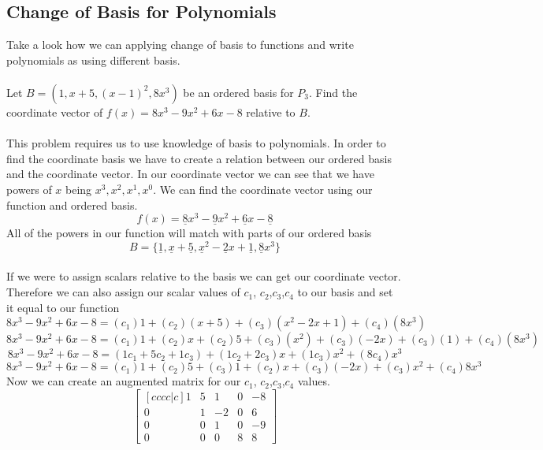 \documentclass[12pt]{article}
\begin{document}
\subsection{Change of Basis for Polynomials}
Take a look how we can applying change of basis to functions and write polynomials as using different basis.
\\\\
Let $B=(1, x+5, (x-1)^2,8x^3)$ be an ordered basis for $P_3$.
Find the coordinate vector of $f(x) = 8x^3-9x^2+6x-8$ relative to $B$.
\\\\
This problem requires us to use knowledge of basis to polynomials. In order to find the coordinate basis we have to create a relation between our ordered basis and the coordinate vector. In our coordinate vector we can see that we have powers of $x$ being $x^3, x^2, x^1, x^0$. We can find the coordinate vector using our function and ordered basis.
\begin{equation*}
f(x) = \underline{8}x^3-\underline{9}x^2+\underline{6}x-\underline{8}
\end{equation*}
All of the powers in our function will match with parts of our ordered basis
\begin{equation*}
B=\{\underline{1}, \underline{x}+\underline{5}, \underline{x}^2 -\underline{2}x +\underline{1},\underline{8}x^3\}
\end{equation*}
\\ If we were to assign scalars relative to the basis we can get our coordinate vector. Therefore we can also assign our scalar values of $c_1$, $c_2$,$c_3$,$c_4$ to our basis and set it equal to our function
\begin{equation*}
8x^3-9x^2+6x-8=(c_1)1+(c_2)(x+5)+(c_3)(x^2-2x+1)+(c_4)(8x^3)
\end{equation*}
\begin{equation*}
8x^3-9x^2+6x-8=(c_1)1+(c_2)x+(c_2)5+(c_3)(x^2)+(c_3)(-2x)+(c_3)(1)+(c_4)(8x^3)
\end{equation*}
\begin{equation*}
8x^3-9x^2+6x-8=(1c_1+5c_2+1c_3)+(1c_2+2c_3)x+(1c_3)x^2+(8c_4)x^3
\end{equation*}
\begin{equation*}
8x^3-9x^2+6x-8=(c_1)1+(c_2)5+(c_3)1+(c_2)x+(c_3)(-2x)+(c_3)x^2+(c_4)8x^3
\end{equation*}
Now we can create an augmented matrix for our $c_1$, $c_2$,$c_3$,$c_4$ values.
\[\begin{bmatrix}[cccc|c]
1 & 5 & 1 & 0 & -8\\
0 & 1 & -2 & 0 & 6\\
0 & 0 & 1 & 0 & -9\\
0 & 0 & 0 & 8 &8
\end{bmatrix}
\]
\end{document}
